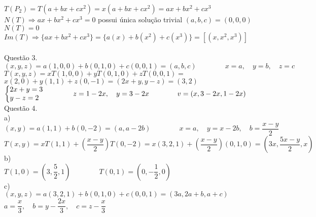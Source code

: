 \documentclass[12pt]{article}
\begin{document}
$T(P_{2})=T(a+bx+cx^{2})=x(a+bx+cx^{2})=ax+bx^{2}+cx^{3}$\\

$N(T)\Longrightarrow ax+bx^{2}+cx^{3}=0$ possui única solução trivial $(a,b,c)=(0,0,0)$\qquad $N(T)=0$\\

$Im(T)\Longrightarrow \lbrace ax+bx^{2}+cx^{3}\rbrace=\lbrace a(x)+b(x^{2})+c(x^{3})\rbrace=[(x,x^{2},x^{3})]$\\

\\

\noindent Questão 3.\\

$(x,y,z)=a(1,0,0)+b(0,1,0)+c(0,0,1)=(a,b,c)\qquad\qquad x=a,\quad y=b,\quad z=c$\\

$T(x,y,z)=xT(1,0,0)+yT(0,1,0)+zT(0,0,1)=$\\

$x(2,0)+y(1,1)+z(0,-1)=(2x+y,y-z)=(3,2)$\\

$\left\{\begin{array}{@{}l@{}}2x+y=3\\y-z=2\end{array}\right.\qquad\qquad z=1-2x,\quad y=3-2x\qquad\qquad v=(x, 3-2x, 1-2x)$\\

\noindent Questão 4.\\

\noindent a)\\

$(x,y)=a(1,1)+b(0,-2)=(a,a-2b)\qquad\qquad x=a,\quad y=x-2b,\quad b = \dfrac{x-y}{2}$\\

$T(x,y)=xT(1,1)+(\dfrac{x-y}{2})T(0,-2)=x(3,2,1)+(\dfrac{x-y}{2})(0,1,0)=(3x,\dfrac{5x-y}{2},x)$\\

\noindent b)\\

$T(1,0)=\left(3,\dfrac{5}{2},1\right)\qquad\qquad T(0,1)=\left(0,-\dfrac{1}{2},0\right)$\\

\noindent c)\\

$(x,y,z)=a(3,2,1)+b(0,1,0)+c(0,0,1)=(3a,2a+b,a+c)$\\

$a=\dfrac{x}{3},\quad b=y-\dfrac{2x}{3},\quad c=z-\dfrac{x}{3}$\\
\end{document}
